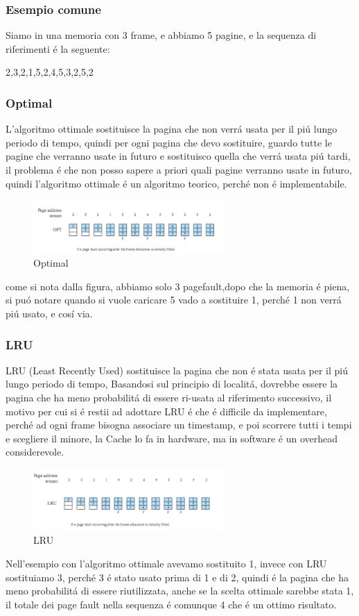     \subsubsection*{Esempio comune}
    Siamo in una memoria con 3 frame, e abbiamo 5 pagine, e la sequenza di riferimenti é la seguente:
    \begin{center}
        2,3,2,1,5,2,4,5,3,2,5,2
    \end{center}
    \subsubsection*{Optimal}
    L'algoritmo ottimale sostituisce la pagina che non verrá usata per il piú lungo periodo di tempo, quindi
    per ogni pagina che devo sostituire, guardo tutte le pagine che verranno usate in futuro e sostituisco quella
    che verrá usata piú tardi, il problema é che non posso sapere a priori quali pagine verranno usate in futuro,
    quindi l'algoritmo ottimale é un algoritmo teorico, perché non é implementabile.
    \begin{figure}[H]
        \centering
        \includegraphics[width=0.65\textwidth]{immagini/AlgoritmoSostituzioneOttimale}
        \caption{Optimal}
    \end{figure}
    come si nota dalla figura, abbiamo solo 3 pagefault,dopo che la memoria é piena, si puó notare quando si vuole caricare 5
    vado a sostituire 1, perché 1 non verrá piú usato, e cosí via.
    \subsubsection*{LRU}
    LRU (Least Recently Used) sostituisce la pagina che non é stata usata per il piú lungo periodo di tempo, Basandosi sul principio
    di localitá, dovrebbe essere la pagina che ha meno probabilitá di essere ri-usata al riferimento successivo, il motivo per cui
    si é restii ad adottare LRU é che é difficile da implementare, perché ad ogni frame bisogna associare un timestamp, e poi
    scorrere tutti i tempi e scegliere il minore, la Cache lo fa in hardware, ma in software é un overhead considerevole.
    \begin{figure}[H]
        \centering
        \includegraphics[width=0.65\textwidth]{immagini/AlgoritmoSostituzioneLRU}
        \caption{LRU}
    \end{figure}
    Nell'esempio con l'algoritmo ottimale avevamo sostituito 1, invece con LRU sostituiamo 3, perché 3 é stato usato
    prima di 1 e di 2, quindi é la pagina che ha meno probabilitá di essere riutilizzata, anche se la scelta ottimale
    sarebbe stata 1, il totale dei page fault nella sequenza é comunque 4 che é un ottimo risultato.
